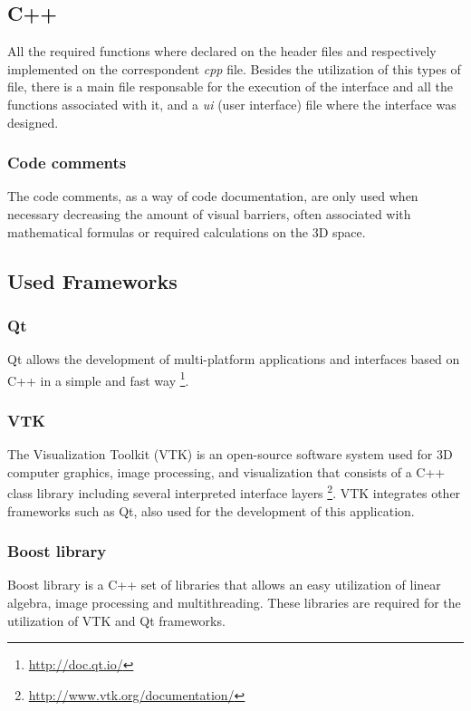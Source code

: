 \subsection{C++}
All the required functions where declared on the header files and respectively implemented on the correspondent \textit{cpp} file. Besides the utilization of this types of file, there is a main file responsable for the execution of the interface and all the functions associated with it, and a \textit{ui} (user interface) file where the interface was designed.

\subsubsection{Code comments}
The code comments, as a way of code documentation, are only used when necessary decreasing the amount of visual barriers, often associated with mathematical formulas or required calculations on the 3D space.

\subsection{Used Frameworks}

\subsubsection{Qt}

Qt allows the development of multi-platform applications and interfaces based on C++ in a simple and fast way \footnote{\url{http://doc.qt.io/}}.

\subsubsection{VTK}
The Visualization Toolkit (VTK) is an open-source software system used for 3D computer graphics, image processing, and visualization that consists of a C++ class library including several interpreted interface layers \footnote{\url{http://www.vtk.org/documentation/}}. VTK integrates other frameworks such as Qt, also used for the development of this application.

\subsubsection{Boost library}
Boost library is a C++ set of libraries that allows an easy utilization of linear algebra, image processing and multithreading. These libraries are required for the utilization of VTK and Qt frameworks.

